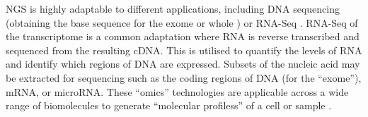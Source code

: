 
\gls{NGS} is highly adaptable to different applications, including \acrshort{DNA} sequencing (obtaining the base sequence for the exome or whole ) or \gls{RNA-Seq} \citep{Waldron2016, Goodwin2016, Tran2012}. %
\gls{RNA-Seq} of the \gls{transcriptome} is a common adaptation where \acrshort{RNA} is reverse transcribed and sequenced from the resulting \gls{cDNA}. This is utilised to quantify the levels of \acrshort{RNA} and identify which regions of \acrshort{DNA} are expressed. 
Subsets of the nucleic acid may be extracted for sequencing such as the coding regions of \acrshort{DNA} (for the ``exome''),  %
mRNA,  %
or \gls{microRNA}. %
These ``\gls{omics}'' technologies \citep{Roychowdhury2016, Waldron2016} are applicable across a wide range of biomolecules to generate ``\glspl{molecular profiles}'' of a cell or sample \citep{Perou2000}. %

